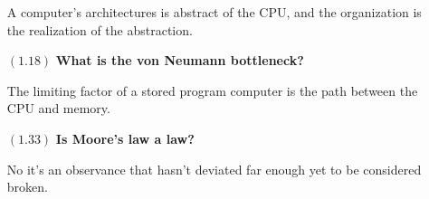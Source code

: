 \documentclass[letterpaper,10pt,titlepage]{article}
\begin{document}
\begin{enumerate}
  A computer's architectures is abstract of the CPU, and the organization is the realization of the abstraction.
  
\item[$(1.18)$] \textbf{What is the von Neumann bottleneck?}

  The limiting factor of a stored program computer is the path between the CPU and memory.

\item[$(1.33)$] \textbf{Is Moore's law a law?}

  No it's an observance that hasn't deviated far enough yet to be considered broken.


\end{enumerate}
\end{document}

